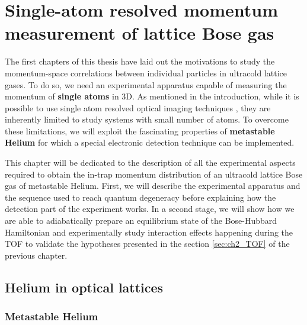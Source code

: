 


\chapter{Single-atom resolved momentum measurement of lattice Bose gas}

\label{sec:chapter_3}

The first chapters of this thesis have laid out the motivations to study the momentum-space correlations between individual particles in ultracold lattice gases. To do so, we need an experimental apparatus capable of measuring the momentum of \textbf{single atoms} in 3D. As mentioned in the introduction, while it is possible to use single atom resolved optical imaging techniques \cite{bucker2009single,serwane2011deterministic}, they are inherently limited to study systems with small number of atoms. To overcome these limitations, we will exploit the fascinating properties of \textbf{metastable Helium} for which a special electronic detection technique can be implemented.


This chapter will be dedicated to the description of all the experimental aspects required to obtain the in-trap momentum distribution of an ultracold lattice Bose gas of metastable Helium. First, we will describe the experimental apparatus and the sequence used to reach quantum degeneracy before explaining how the detection part of the experiment works. In a second stage, we will show how we are able to adiabatically prepare an equilibrium state of the Bose-Hubbard Hamiltonian and experimentally study interaction effects happening during the TOF to validate the hypotheses presented in the section \ref{sec:ch2_TOF} of the previous chapter.




\section{Helium in optical lattices}

\subsection{Metastable Helium}

